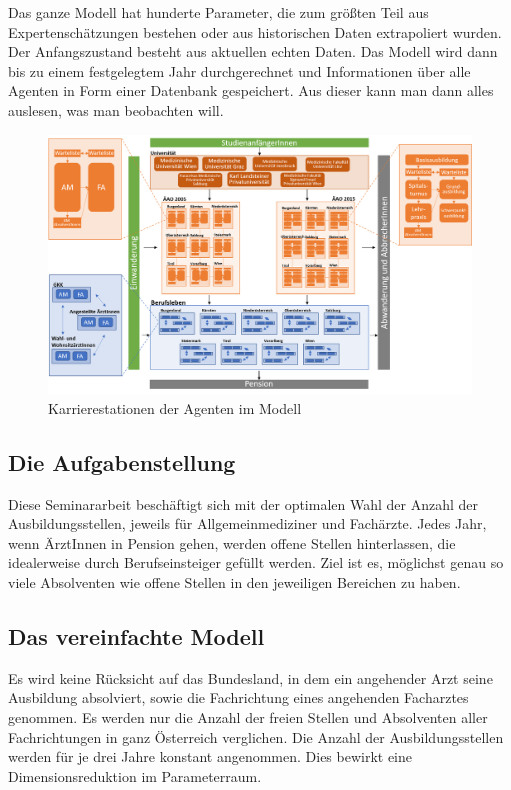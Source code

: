 \documentclass[a4paper,12pt]{article}
\begin{document}
Das ganze Modell hat hunderte Parameter, die zum größten Teil aus Expertenschätzungen bestehen oder aus historischen Daten extrapoliert wurden. Der Anfangszustand besteht aus aktuellen echten Daten. Das Modell wird dann bis zu einem festgelegtem Jahr durchgerechnet und Informationen über alle Agenten in Form einer Datenbank gespeichert. Aus dieser kann man dann alles auslesen, was man beobachten will.

\begin{figure}[h]
\includegraphics[width=\textwidth]{modellgraph.png}
\caption{Karrierestationen der Agenten im Modell}
\end{figure}


\subsection{Die Aufgabenstellung}

Diese Seminararbeit beschäftigt sich mit der optimalen Wahl der Anzahl der Ausbildungsstellen, jeweils für Allgemeinmediziner und Fachärzte. Jedes Jahr, wenn ÄrztInnen in Pension gehen, werden offene Stellen hinterlassen, die idealerweise durch Berufseinsteiger gefüllt werden. Ziel ist es, möglichst genau so viele Absolventen wie offene Stellen in den jeweiligen Bereichen zu haben.

\subsection{Das vereinfachte Modell}

Es wird keine Rücksicht auf das Bundesland, in dem ein angehender Arzt seine Ausbildung absolviert, sowie die Fachrichtung eines angehenden Facharztes genommen. Es werden nur die Anzahl der freien Stellen und Absolventen aller Fachrichtungen in ganz Österreich verglichen. Die Anzahl der Ausbildungsstellen werden für je drei Jahre konstant angenommen. Dies bewirkt eine Dimensionsreduktion im Parameterraum.
\end{document}
